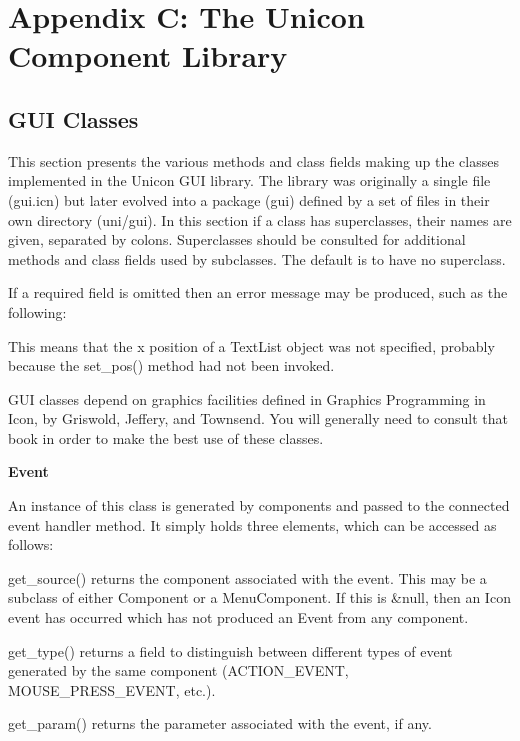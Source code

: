 \clearpage\section{Appendix C: The Unicon Component Library}

\subsection{GUI Classes}

This section presents the various methods and class fields making up the
classes implemented in the Unicon GUI library. The library was
originally a single file (gui.icn) but later evolved into a package
(gui) defined by a set of files in their own directory (uni/gui). In
this section if a class has superclasses, their names are given,
separated by colons. Superclasses should be consulted for additional
methods and class fields used by subclasses. The
default is to have no superclass.

If a required field is omitted then an error message may be produced,
such as the following:


This means that the x position of a TextList object was not specified,
probably because the set\_pos() method had not been invoked.

GUI classes depend on graphics facilities defined in
{\textquotedbl}Graphics Programming in Icon{\textquotedbl}, by
Griswold, Jeffery, and Townsend. You will generally need to consult
that book in order to make the best use of these classes.

{\sffamily\bfseries
{}Event}

An instance of this class is generated by components and passed to the
connected event handler method. It simply holds three elements, which
can be accessed as follows:

get\_source() returns the component associated with the event. This may
be a subclass of either Component or a MenuComponent. If this is
\&null, then an Icon event has occurred which has not produced an Event
from any component.

get\_type() returns a field to distinguish between different types of
event generated by the same component (ACTION\_EVENT,
MOUSE\_PRESS\_EVENT, etc.).

get\_param() returns the parameter associated with the event, if any.

